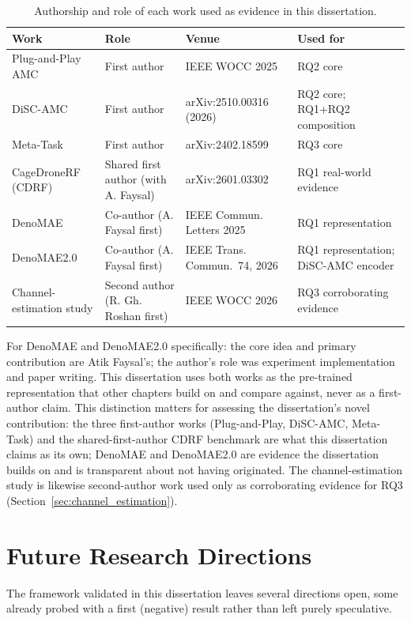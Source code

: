 \begin{table}[htbp]
\centering
\caption{Authorship and role of each work used as evidence in this dissertation.}
\label{tab:authorship}
\small
\begin{tabular}{p{}p{}p{}p{}}
\toprule
Work & Role & Venue & Used for \\
\midrule
Plug-and-Play AMC & First author & IEEE WOCC 2025 & RQ2 core \\
DiSC-AMC & First author & arXiv:2510.00316 (2026) & RQ2 core; RQ1+RQ2 composition \\
Meta-Task & First author & arXiv:2402.18599 & RQ3 core \\
CageDroneRF (CDRF) & Shared first author (with A. Faysal) & arXiv:2601.03302 & RQ1 real-world evidence \\
DenoMAE & Co-author (A. Faysal first) & IEEE Commun. Letters 2025 & RQ1 representation \\
DenoMAE2.0 & Co-author (A. Faysal first) & IEEE Trans. Commun.\ 74, 2026 & RQ1 representation; DiSC-AMC encoder \\
Channel-estimation study & Second author (R. Gh. Roshan first) & IEEE WOCC 2026 & RQ3 corroborating evidence \\
\bottomrule
\end{tabular}
\end{table}

For DenoMAE and DenoMAE2.0 specifically: the core idea and primary contribution are Atik Faysal's; the author's role was experiment implementation and paper writing. This dissertation uses both works as the pre-trained representation that other chapters build on and compare against, never as a first-author claim. This distinction matters for assessing the dissertation's novel contribution: the three first-author works (Plug-and-Play, DiSC-AMC, Meta-Task) and the shared-first-author CDRF benchmark are what this dissertation claims as its own; DenoMAE and DenoMAE2.0 are evidence the dissertation builds on and is transparent about not having originated. The channel-estimation study is likewise second-author work used only as corroborating evidence for RQ3 (Section~\ref{sec:channel_estimation}).

\section{Future Research Directions}
\label{sec:future_work}

The framework validated in this dissertation leaves several directions open, some already probed with a first (negative) result rather than left purely speculative.

